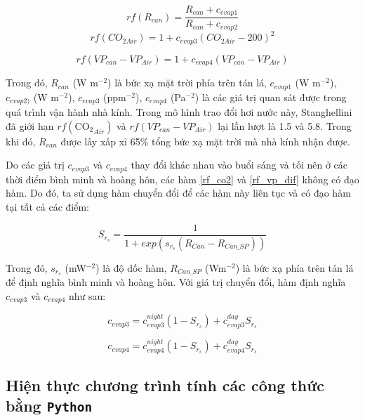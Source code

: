 \documentclass[a4paper]{article}
\begin{document}
\begin{equation}
    rf(R_{can}) = \frac{R_{can}+c_{evap1}}{R_{can}+c_{evap2}}
\end{equation}
\begin{equation}\label{rf_co2}
    rf(CO_{2 Air}) = 1+c_{evap3}(CO_{2 Air}-200)^2
\end{equation}
    
\begin{equation}\label{rf_vp_dif}
    rf(VP_{can}-VP_{Air}) = 1+c_{evap4}(VP_{can}-VP_{Air})
\end{equation}

Trong đó, $R_{can}$ (W m$^{-2}$) là bức xạ mặt trời phía trên tán lá, $c_{evap1}$ (W m$^{-2}$), $c_{evap2)}$ (W m$^{-2}$), $c_{evap3}$ (ppm$^{-2}$), $c_{evap4}$ (Pa$^{-2}$) là các giá trị quan sát được trong quá trình vận hành nhà kính. Trong mô hình trao đổi hơi nước này, Stanghellini đã giới hạn $rf(\mathrm{CO_2}_{Air})$ và $rf(VP_{can}-VP_{Air})$ lại lần lượt là 1.5 và 5.8. Trong khi đó, $R_{can}$ được lấy xấp xỉ 65\% tổng bức xạ mặt trời mà nhà kính nhận được.

Do các giá trị $c_{evap3}$ và $c_{evap4}$ thay đổi khác nhau vào buổi sáng và tối nên ở các thời điểm bình minh và hoàng hôn, các hàm \eqref{rf_co2}
 và \eqref{rf_vp_dif} không có đạo hàm. Do đó, ta sử dụng hàm chuyển đổi để
các hàm này liên tục và có đạo hàm tại tất cả các điểm:

\begin{equation}
    S_{r_s} = \frac{1}{1+exp(s_{r_s}(R_{Can}-R_{Can\_SP}))}
\end{equation}

Trong đó, $s_{r_s}$ (mW$^{-2}$) là độ dốc hàm, $R_{Can\_SP}$ (Wm$^{-2}$) là bức xạ phía trên tán lá để định nghĩa bình minh và hoàng hôn. Với giá trị chuyển đổi, hàm định nghĩa $c_{evap3}$ và $c_{evap4}$ như sau:

\begin{equation}
    c_{evap3} = c^{night}_{evap3} (1-S_{r_s}) + c^{day}_{evap3} S_{r_s}
\end{equation}

\begin{equation}
    c_{evap4} = c^{night}_{evap4} (1-S_{r_s}) + c^{day}_{evap4} S_{r_s}
\end{equation}



\subsection{Hiện thực chương trình tính các công thức bằng \texttt{Python}}
\end{document}

